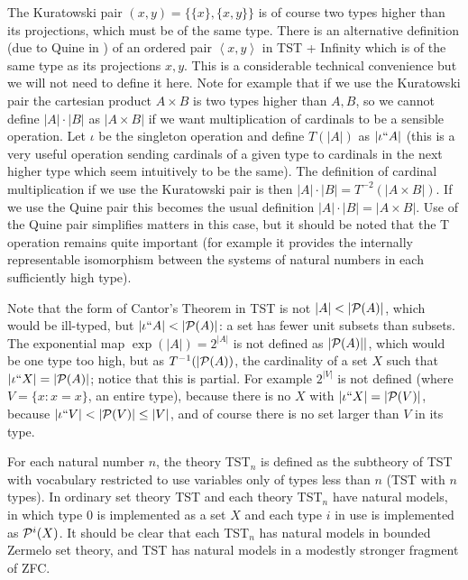 \documentclass[112pt]{article}
\begin{document}
The Kuratowski pair $(x,y) = \{\{x\},\{x,y\}\}$ is of course two types higher than its projections, which must be of the same type.  There is an alternative definition (due to Quine in \cite{quinepair}) of an ordered pair
$\left< x,y\right>$ in TST + Infinity which is of the same type as its projections $x,y$.  This is a considerable technical convenience but we will not need to define it here.  Note for example that if we use the Kuratowski pair the cartesian product $A \times B$ is two types higher than $A,B$, so we cannot define $|A| \cdot |B|$ as $|A \times B|$ if we want multiplication of cardinals to be a sensible operation.  Let $\iota$ be the singleton operation and define $T(|A|)$ as $|\iota``A|$ (this is a very useful operation sending cardinals of a given type to cardinals in the next higher type which seem intuitively to be the same).  The definition of cardinal multiplication if we use the Kuratowski pair is then $|A| \cdot |B| =T^{-2}(|A\times B|)$.  If we use the Quine pair this becomes the usual definition $|A| \cdot |B| =|A\times B|$.  Use of the Quine pair simplifies matters in this case, but it should be noted that the T operation remains quite important (for example it provides the internally representable isomorphism between the systems of natural numbers in each sufficiently high type).

Note that the form of Cantor's Theorem in TST is not $|A| < |{\cal P}(A)|$, which would be ill-typed, but $|\iota``A|<|{\cal P}(A)|$:  a set has fewer unit subsets than subsets.  The exponential map $\exp(|A|) = 2^{|A|}$ is not defined as $|{\cal P}(A)||$, which would be one type too high, but as $T^{-1}(|{\cal P}(A))$, the cardinality of a set $X$ such that $|\iota``X| = |{\cal P}(A)|$;   notice that this is partial.  For example
$2^{|V|}$ is not defined (where $V=\{x:x=x\}$, an entire type), because there is no $X$ with $|\iota``X|=|{\cal P}(V)|$, because $|\iota``V|<|{\cal P}(V)| \leq |V|$, and of course there is no set larger than $V$ in its type.

For each natural number $n$, the theory TST$_n$ is defined as the subtheory of TST with vocabulary restricted to use variables only of types less than $n$ (TST with $n$ types).
In ordinary set theory TST and each theory TST$_n$ have natural models, in which type 0 is implemented as a set $X$ and each type $i$ in use is implemented as ${\cal P}^i(X)$.  It should be clear that each TST$_n$ has natural models in bounded Zermelo set theory, and TST has natural models in a modestly stronger fragment of ZFC.
\end{document}
